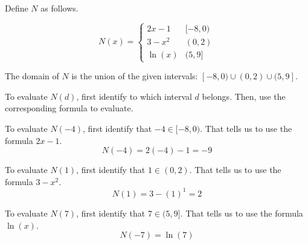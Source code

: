 \documentclass{ximera}
\begin{document}
\begin{example}

Define $N$ as follows.


\[
N(x) = 
\begin{cases}
  2x - 1   &    [-8, 0)     \\
  3 - x^2  &    (0, 2) \\
  \ln(x)    &    (5, 9]
\end{cases}
\]


\begin{explanation}

The domain of $N$ is the union of the given intervals: $[-8, 0) \cup (0,2) \cup (5, 9]$.


To evaluate $N(d)$, first identify to which interval $d$ belongs.  Then, use the corresponding formula to evaluate.







\end{explanation}




To evaluate $N(-4)$, first identify that $-4 \in [-8, 0)$.  That tells us to use the formula $2x - 1$. \\

\[  N(-4) = 2(-4) - 1 = -9  \]





To evaluate $N(1)$, first identify that $1 \in (0, 2)$.  That tells us to use the formula $3 - x^2$. \\

\[  N(1) = 3 - (1)^1 = 2  \]





To evaluate $N(7)$, first identify that $7 \in (5, 9]$.  That tells us to use the formula $\ln(x)$. \\

\[  N(-7) = \ln(7)  \]



\end{example}
\end{document}
